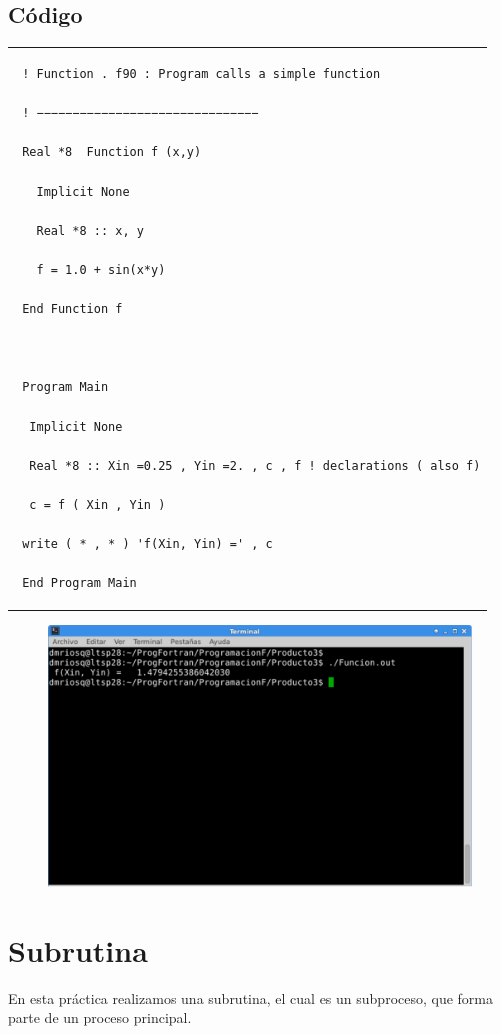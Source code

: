 \documentclass[10pt]{article}
\begin{document}
\subsection{Código}
\begin{tabular}{l}
\begin{verbatim}  
 ! Function . f90 : Program calls a simple function

 ! −−−−−−−−−−−−−−−−−−−−−−−−−−−−−−−

 Real *8  Function f (x,y)

   Implicit None

   Real *8 :: x, y

   f = 1.0 + sin(x*y)

 End Function f



 Program Main

  Implicit None

  Real *8 :: Xin =0.25 , Yin =2. , c , f ! declarations ( also f)

  c = f ( Xin , Yin )

 write ( * , * ) 'f(Xin, Yin) =' , c

 End Program Main 
\end{verbatim}
\end{tabular}

\begin{figure}
  \centering
    \includegraphics[scale=0.4]{F}
\end{figure}



\section{Subrutina}
En esta práctica realizamos una subrutina, el cual es un subproceso, que forma parte de un proceso principal.
\end{document}
